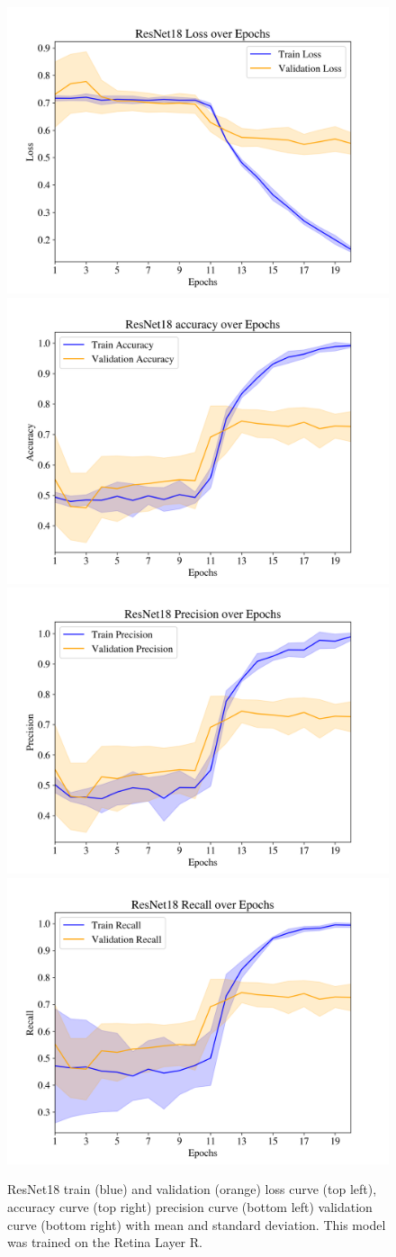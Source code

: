 \documentclass{article} %
\begin{document}
\begin{figure}[h]
   \begin{center}
   \includegraphics[width=.4\linewidth]{../plots/resnet18/loss.png}
   \includegraphics[width=.4\linewidth]{../plots/resnet18/accuracy.png}
   \includegraphics[width=.4\linewidth]{../plots/resnet18/precision.png}
   \includegraphics[width=.4\linewidth]{../plots/resnet18/recall.png}
   \end{center}
   \caption{ResNet18 train (blue) and validation (orange) loss curve (top left), accuracy curve (top right) precision curve (bottom left) validation curve (bottom right) with mean and standard deviation. This model was trained on the Retina Layer R.}
\end{figure}
\end{document}
